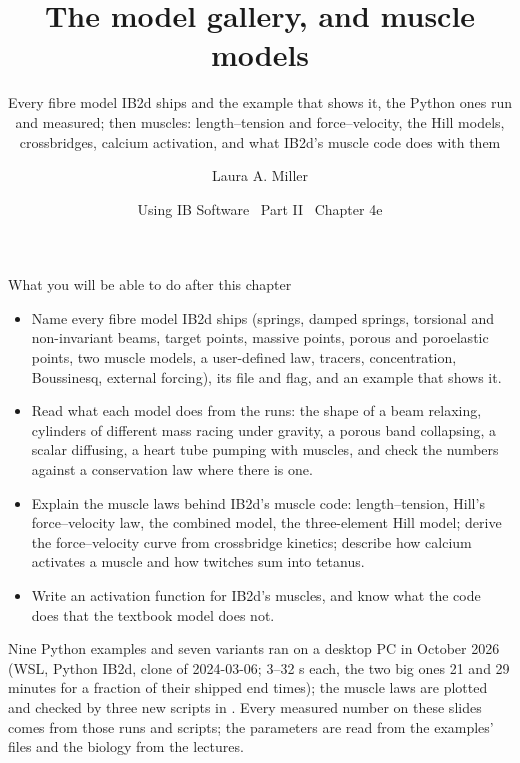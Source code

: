 \documentclass[aspectratio=169,11pt]{beamer}
\title[IB2d: model gallery and muscles]{The model gallery, and muscle models}
\subtitle{Every fibre model IB2d ships and the example that shows it, the Python ones run and measured; then muscles: length--tension and force--velocity, the Hill models, crossbridges, calcium activation, and what IB2d's muscle code does with them}
\author[Miller]{Laura A. Miller}
\institute[UArizona]{Department of Mathematics, University of Arizona}
\date{Using IB Software \textbullet\ Part II \textbullet\ Chapter 4e}
\begin{document}
\begin{frame}[plain]
\end{frame}

\begin{frame}{What you will be able to do after this chapter}
\label{fr:goals}
\footnotesize
\begin{itemize}
  \item Name every fibre model IB2d ships (springs, damped springs, torsional and non-invariant beams, target points, massive points, porous and poroelastic points, two muscle models, a user-defined law, tracers, concentration, Boussinesq, external forcing), its file and flag, and an example that shows it.
  \item Read what each model does from the runs: the shape of a beam relaxing, cylinders of different mass racing under gravity, a porous band collapsing, a scalar diffusing, a heart tube pumping with muscles, and check the numbers against a conservation law where there is one.
  \item Explain the muscle laws behind IB2d's muscle code: length--tension, Hill's force--velocity law, the combined model, the three-element Hill model; derive the force--velocity curve from crossbridge kinetics; describe how calcium activates a muscle and how twitches sum into tetanus.
  \item Write an activation function for IB2d's muscles, and know what the code does that the textbook model does not.
\end{itemize}
\begin{punchbox}
\small Nine Python examples and seven variants ran on a desktop PC in October 2026 (WSL, Python IB2d, clone of 2024-03-06; 3--32 s each, the two big ones 21 and 29 minutes for a fraction of their shipped end times); the muscle laws are plotted and checked by three new scripts in . Every measured number on these slides comes from those runs and scripts; the parameters are read from the examples' files and the biology from the lectures.
\end{punchbox}
\end{frame}
\end{document}
